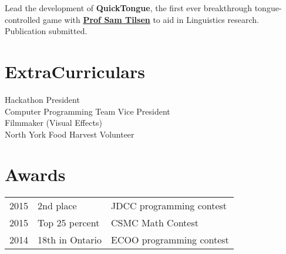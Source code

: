 \documentclass[]{DavidTsenterResume}
\begin{document}
\begin{minipage}[t]{0.66\textwidth}
Lead the development of \textbf{QuickTongue}, the first ever breakthrough tongue-controlled game with \textbf{\href{http://conf.ling.cornell.edu/~tilsen/}{Prof Sam Tilsen}} to aid in Linguistics research. Publication submitted.
\sectionsep
\section{ExtraCurriculars}
\textbullet{} Hackathon President \\
\textbullet{} Computer Programming Team Vice President \\
\textbullet{} Filmmaker (Visual Effects) \\
\textbullet{} North York Food Harvest Volunteer \\
\sectionsep
\sectionsep


\section{Awards} 
\begin{tabular}{rll}
2015	     & 2nd place  & JDCC programming contest\\
2015     & Top 25 percent& CSMC Math Contest\\
2014	     & 18th in Ontario  & ECOO programming contest\\

\end{tabular}
\sectionsep

\end{minipage} 
\end{document}
